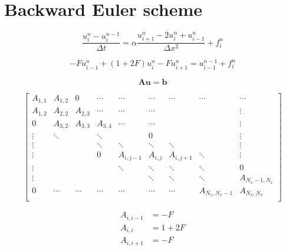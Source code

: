 \documentclass[a4paper,11pt]{article}
\begin{document}
\section{Backward Euler scheme}

\begin{equation}
\frac{u_{i}^{n} - u_{i}^{n-1}}{\Delta t} = \alpha
\frac{u^{n}_{i+1} - 2u^{n}_{i} + u^{n}_{i-1}}{\Delta x^2} + f_{i}^{n}
\end{equation}

\begin{equation}
-Fu_{i-1}^{n} + (1 + 2F)u_{i}^{n} - F u_{i+1}^{n} = u^{n-1}_{i-1} + f^{n}_{i}
\end{equation}

\begin{equation}
\mathbf{A}\mathbf{u} = \mathbf{b}
\end{equation}


\begin{equation}
\begin{bmatrix}
A_{1,1} & A_{1,2} & 0       & \cdots  & \cdots    & \cdots  & \cdots    & \cdots        & \cdots \\
A_{1,2} & A_{2,2} & A_{2,3} & \cdots  & \cdots    & \cdots  &           &               & \vdots \\
0       & A_{3,2} & A_{3,3} & A_{3,4} & \cdots    & \cdots  &           &               & \vdots \\
\vdots  & \ddots  &         & \ddots  &           &  0      &           &               & \vdots \\
\vdots  &         &         & \ddots  & \ddots    & \ddots  & \ddots    &               & \vdots \\
\vdots  &         &         & 0       & A_{i,j-1} & A_{i,j} & A_{i,j+1} & \ddots        & \vdots \\
\vdots  &         &         &         & \ddots    & \ddots  & \ddots    & \ddots        & 0 \\
\vdots  &         &         &         &           & \ddots  & \ddots    & \ddots        & A_{N_x-1,N_x} \\
0       & \cdots  & \cdots  & \cdots  & \cdots    & \cdots  & \cdots    & A_{N_x,N_x-1} & A_{N_x,N_x} \\
\end{bmatrix}
\end{equation}

\begin{align*}
A_{i,i-1} & = -F \\
A_{i,i}   & = 1 + 2F \\
A_{i,i+1} & = -F
\end{align*}
\end{document}
